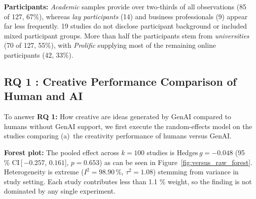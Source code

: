 \documentclass[manuscript, screen, review, acmsmall, anonymous]{acmart}
\begin{document}
\textbf{Participants:} \emph{Academic} samples provide over two‑thirds of all observations (85 of 127, 67\%), whereas \emph{lay participants} (14) and business professionals (9) appear far less frequently. 19 studies do not disclose participant background or included mixed participant groups. More than half the participants stem from \emph{universities} (70 of 127, 55\%), with \emph{Prolific} supplying most of the remaining online participants (42, 33\%).




\subsection{RQ 1 : Creative Performance Comparison of Human and AI}
\label{sec:CreativePerformanceComparisonOfHumanAndAI}

To answer \textbf{RQ 1:} How creative are ideas generated by GenAI compared to humans without GenAI support, we first execute the random-effects model on the studies comparing (a)~the creativity performance of humans versus GenAI.

\textbf{Forest plot:} The pooled effect across $k=100$ studies is Hedges\,$g=-0.048$ (95 \% CI\,[\,$-0.257$, $0.161$], $p=0.653$)  as can be seen in Figure~\ref{fig:versus_raw_forest}. Heterogeneity is extreme ($I^{2}=98.90\,\%$, $\tau^{2}=1.08$) stemming from variance in study setting. Each study contributes less than 1.1 \% weight, so the finding is not dominated by any single experiment.
\end{document}
